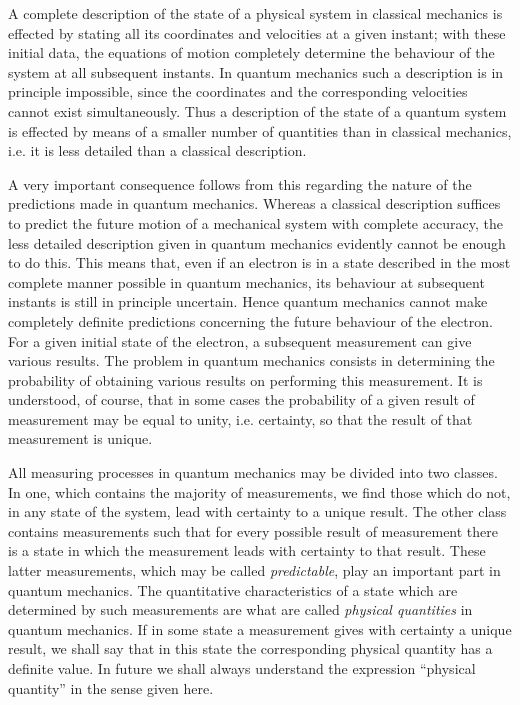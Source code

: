 A complete description of the state of a physical system in classical mechanics is effected by stating all its coordinates and velocities at a given instant; with these initial data, the equations of motion completely determine the behaviour of the system at all subsequent instants. In quantum mechanics such a description is in principle impossible, since the coordinates and the corresponding velocities cannot exist simultaneously. Thus a description of the state of a quantum system is effected by means of a smaller number of quantities than in classical mechanics, i.e. it is less detailed than a classical description.


A very important consequence follows from this regarding the nature of the predictions made in quantum mechanics. Whereas a classical description suffices to predict the future motion of a mechanical system with complete accuracy, the less detailed description given in quantum mechanics evidently cannot be enough to do this. This means that, even if an electron is in a state described in the most complete manner possible in quantum mechanics, its behaviour at subsequent instants is still in principle uncertain. Hence quantum mechanics cannot make completely definite predictions concerning the future behaviour of the electron. For a given initial state of the electron, a subsequent measurement can give various results. The problem in quantum mechanics consists in determining the probability of obtaining various results on performing this measurement. It is understood, of course, that in some cases the probability of a given result of measurement may be equal to unity, i.e. certainty, so that the result of that measurement is unique.


All measuring processes in quantum mechanics may be divided into two classes. In one, which contains the majority of measurements, we find those which do not, in any state of the system, lead with certainty to a unique result. The other class contains measurements such that for every possible result of measurement there is a state in which the measurement leads with certainty to that result. These latter measurements, which may be called \textit{predictable}, play an important part in quantum mechanics. The quantitative characteristics of a state which are determined by such measurements are what are called \textit{physical quantities} in quantum mechanics. If in some state a measurement gives with certainty a unique result, we shall say that in this state the corresponding physical quantity has a definite value. In future we shall always understand the expression “physical quantity” in the sense given here.


